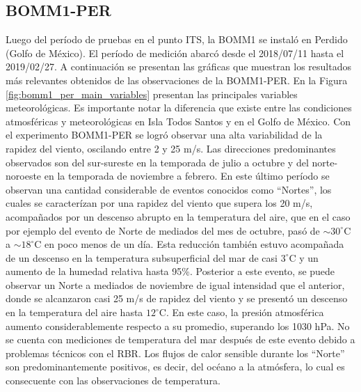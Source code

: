 \documentclass[11pt]{article}
\begin{document}
\subsection{BOMM1-PER}
\label{sub:bomm1_per}

Luego del período de pruebas en el punto ITS, la BOMM1 se instaló en Perdido
(Golfo de México). El período de medición abarcó desde el 2018/07/11 hasta el
2019/02/27. A continuación se presentan las gráficas que muestran los resultados
más relevantes obtenidos de las observaciones de la BOMM1-PER.  En la Figura
\ref{fig:bomm1_per_main_variables} presentan las principales variables
meteorológicas. Es importante notar la diferencia que existe entre las
condiciones atmosféricas y meteorológicas en Isla Todos Santos y en el Golfo de
México. Con el experimento BOMM1-PER se logró observar una alta variabilidad de
la rapidez del viento, oscilando entre 2 y 25 m/s. Las direcciones predominantes
observados son del sur-sureste en la temporada de julio a octubre y del
norte-noroeste en la temporada de noviembre a febrero. En este último período se
observan una cantidad considerable de eventos conocidos como ``Nortes'', los
cuales se caracterízan por una rapidez del viento que supera los 20 m/s,
acompañados por un descenso abrupto en la temperatura del aire, que en el caso
por ejemplo del evento de Norte de mediados del mes de octubre, pasó de $\sim
30^\circ\mathrm{C}$ a $\sim 18^\circ\mathrm{C}$ en poco menos de un día. Esta
reducción también estuvo acompañada de un descenso en la temperatura
subsuperficial del mar de casi $3^\circ\mathrm{C}$ y un aumento de la humedad
relativa hasta 95\%. Posterior a este evento, se puede observar un Norte a
mediados de noviembre de igual intensidad que el anterior, donde se alcanzaron
casi 25 m/s de rapidez del viento y se presentó un descenso en la temperatura
del aire hasta $12^\circ\mathrm{C}$. En este caso, la presión atmosférica
aumento considerablemente respecto a su promedio, superando los 1030 hPa. No se
cuenta con mediciones de temperatura del mar después de este evento debido a
problemas técnicos con el RBR. Los flujos de calor sensible durante los
``Norte'' son predominantemente positivos, es decir, del océano a la atmósfera,
lo cual es consecuente con las observaciones de temperatura.
\end{document}
